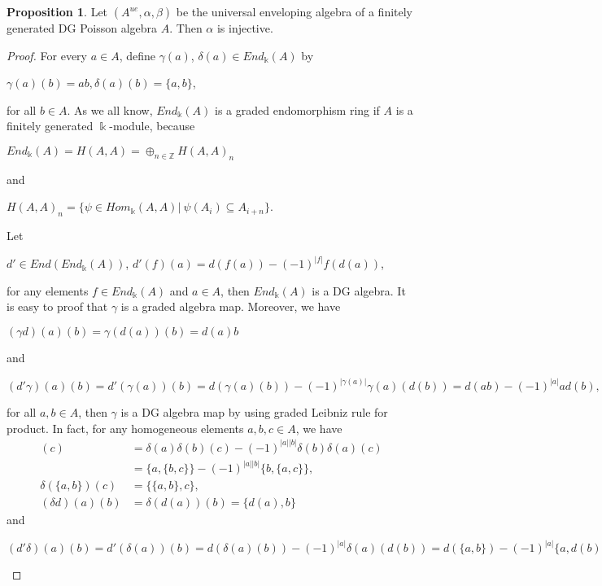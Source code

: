 \documentclass[a4paper,10pt]{amsart}
\theoremstyle{definition}
\newtheorem{prop}[theorem]{Proposition}
\theoremstyle{remark}
\numberwithin{equation}{section}
\begin{document}
\begin{prop}
Let $(A^{ue}, \alpha, \beta)$ be the universal enveloping algebra of
a finitely generated DG Poisson algebra $A$. Then $\alpha$ is
injective.
\end{prop}

\begin{proof}
For every $a\in A$, define $\gamma(a)$, $\delta(a)\in
End_{\Bbbk}(A)$ by
\begin{center}
$\gamma(a)(b)=ab, \delta(a)(b)=\{a, b\}$,
\end{center}
for all $b\in A$. As we all know, $End_{\Bbbk}(A)$ is a graded
endomorphism ring if $A$ is a finitely generated $\Bbbk$-module,
because
 \begin{center}
$End_{\Bbbk}(A)=H(A, A)=\oplus_{n\in \mathbb{Z}}H(A, A)_n$
\end{center}
and
 \begin{center}
$H(A, A)_n=\{\psi\in Hom_{\Bbbk}(A, A) | ~\psi(A_i)\subseteq
A_{i+n}\}$.
\end{center}
Let
\begin{center}
$d'\in End(End_{\Bbbk}(A))$, $d'(f)(a)=d(f(a))-(-1)^{|f|}f(d(a))$,
\end{center}
for any elements $f\in End_{\Bbbk}(A)$ and $a\in A$, then
$End_{\Bbbk}(A)$ is a DG algebra. It is easy to proof that $\gamma$
is a graded algebra map. Moreover, we have
\begin{center}
 $(\gamma d)(a)(b)=\gamma(d(a))(b)=d(a)b$
 \end{center}
 and
\begin{center}
 $(d'\gamma)(a)(b)=d'(\gamma(a))(b)=d(\gamma(a)(b))-(-1)^{|\gamma(a)|}\gamma(a)(d(b))=d(ab)-(-1)^{|a|}ad(b),$
\end{center}
for all $a, b\in A$, then $\gamma$ is a DG algebra map by using
graded Leibniz rule for product. In fact, for any homogeneous
elements $a, b, c\in A$, we have
\begin{align*}
[\delta(a), \delta(b)](c)&=\delta(a)\delta(b)(c)-(-1)^{|a||b|}\delta(b)\delta(a)(c)\\
&=\{a, \{b, c\}\}-(-1)^{|a||b|}\{b, \{a, c\}\},\\
\delta(\{a, b\})(c)&=\{\{a, b\}, c\},\\
(\delta d)(a)(b)&=\delta(d(a))(b)=\{d(a), b\}
\end{align*}
and
\begin{center}
 $(d'\delta)(a)(b)=d'(\delta(a))(b)=d(\delta(a)(b))-(-1)^{|a|}\delta(a)(d(b))=d(\{a, b\})-(-1)^{|a|}\{a, d(b)\}.$
 \end{center}

\end{proof}
\end{document}
